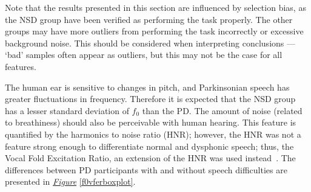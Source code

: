 \documentclass[12pt, twoside]{book}
\begin{document}
Note that the results presented in this section are influenced by selection bias, as the NSD group have been verified as performing the task properly. The other groups may have more outliers from performing the task incorrectly or excessive background noise. This should be considered when interpreting conclusions --- `bad' samples often appear as outliers, but this may not be the case for all features.

The human ear is sensitive to changes in pitch, and Parkinsonian speech has greater fluctuations in frequency. Therefore it is expected that the NSD group has a lesser standard deviation of $f_0$ than the PD. The amount of noise (related to breathiness) should also be perceivable with human hearing. This feature is quantified by the harmonics to noise ratio (HNR); however, the HNR was not a feature strong enough to differentiate normal and dysphonic speech; thus, the Vocal Fold Excitation Ratio, an extension of the HNR was used instead~\cite{spoverview}. The differences between PD participants with and without speech difficulties are presented in \textit{\hyperref[f0vferboxplot]{Figure}} \ref{f0vferboxplot}. 


\end{document}
